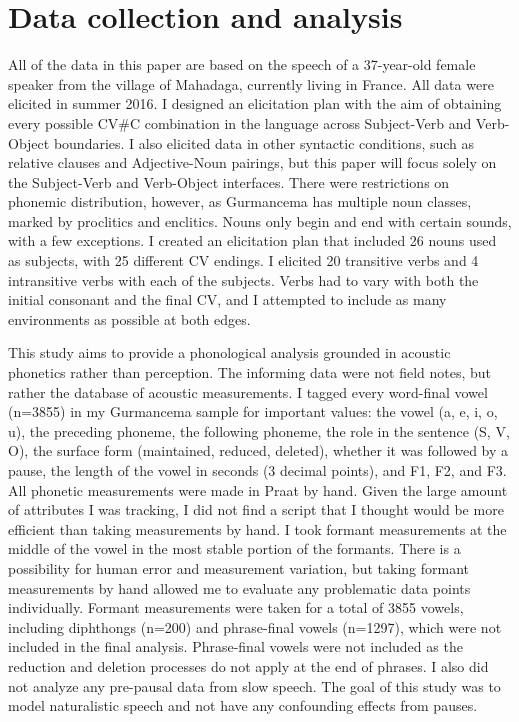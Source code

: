 \documentclass[output=paper,newtxmath,modfonts,nonflat,draftmode]{langsci/langscibook}
\begin{document}
\section{Data collection and analysis}

All of the data in this paper are based on the speech of a 37-year-old female 
speaker from the village of Mahadaga, currently living in France. All data were elicited in summer 2016. I designed an elicitation plan with the aim of obtaining every possible CV\#C combination in the language across Subject-Verb and Verb-Object boundaries. I also elicited data in other syntactic conditions, such as relative clauses and Adjective-Noun pairings, but this paper will focus solely on the Subject-Verb and Verb-Object interfaces. There were restrictions on phonemic distribution, however, as Gurmancema has multiple noun classes, marked by proclitics and enclitics.  Nouns only begin and end with certain sounds, with a few exceptions. I created an elicitation plan that included 26 nouns used as subjects, with 25 different CV endings. I elicited 20 transitive verbs and 4 intransitive verbs with each of the subjects. Verbs had to vary with both the initial consonant and the final CV, and I attempted to include as many environments as possible at both edges. 

This study aims to provide a phonological analysis grounded in acoustic phonetics rather than perception. The informing data were not field notes, but rather the database of acoustic measurements. I tagged every word-final vowel (n=3855) in my Gurmancema sample for important values: the vowel (a, e, i, o, u), the preceding phoneme, the following phoneme, the role in the sentence (S, V, O), the surface form (maintained, reduced, deleted), whether it was followed by a pause, the length of the vowel in seconds (3 decimal points), and F1, F2, and 
F3. All phonetic measurements were made in Praat \citep{Boersma1996} by hand. Given the large amount of attributes I was tracking, I did not find a script that I thought would be more efficient than taking measurements by hand. I took formant measurements at the middle of the vowel in the most stable portion of the formants. There is a possibility for human error and measurement variation, but taking formant measurements by hand allowed me to evaluate any problematic data points individually. Formant measurements were taken for a total of 3855 vowels, including diphthongs (n=200) and phrase-final vowels (n=1297), which were not included in the final 
analysis. Phrase-final vowels were not included as the reduction and deletion processes do not apply at the end of phrases. I also did not analyze any pre-pausal data from slow speech. The goal of this study was to model naturalistic speech and not have any confounding effects from pauses. 
\end{document}
